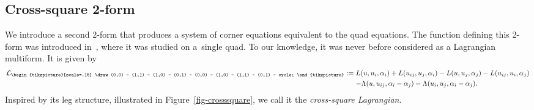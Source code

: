 \documentclass[pdftex]{sigma}
\newcommand{\crosssquare}{{\begin{tikzpicture}[scale=.15]
			\draw (0,0) -- (1,1) -- (1,0) -- (0,1) -- (0,0) -- (1,0) -- (1,1) -- (0,1) -- cycle;
\end{tikzpicture}}}
\newcommand{\cL}{\mathcal{L}}
\numberwithin{equation}{section}
\begin{document}
\subsection{Cross-square 2-form}

We introduce a second 2-form that produces a system of corner equations equivalent to the quad equations. The function defining this 2-form was introduced in~\cite{bobenko2010lagrangian}, where it was studied on a~single quad. To our knowledge, it was never before considered as a Lagrangian multiform. It is given by
\begin{align*}
\begin{split}
		\cL_\crosssquare:={}& L(u,u_i,\alpha_i) + L(u_{ij},u_j, \alpha_i) - L(u,u_j,\alpha_j) - L(u_{ij},u_i, \alpha_j) \\
		&{}{-} \Lambda(u,u_{ij},\alpha_i-\alpha_j) - \Lambda(u_i,u_j,\alpha_i-\alpha_j).
\end{split}
\end{align*}
Inspired by its leg structure, illustrated in Figure~\ref{fig-crosssquare}, we call it the \emph{cross-square Lagrangian}.
\end{document}
